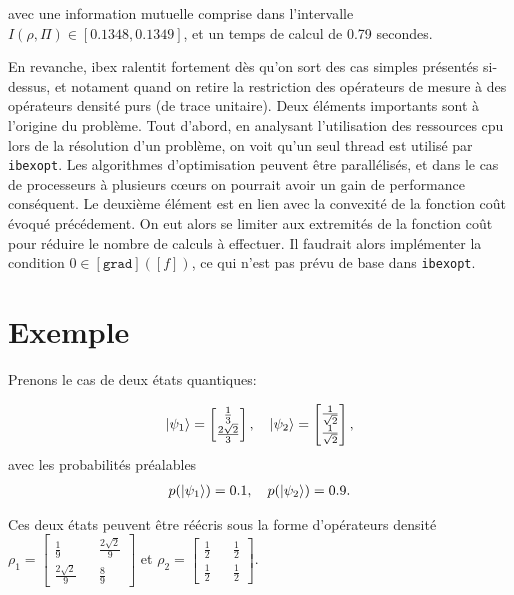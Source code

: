 avec une information mutuelle comprise dans l'intervalle $I(\rho, \Pi) \in [0.1348, 0.1349]$, et un temps de calcul de 0.79 secondes.


En revanche, ibex ralentit fortement dès qu'on sort des cas simples présentés si-dessus, et notament quand on retire la restriction des opérateurs de mesure à des opérateurs densité purs (de trace unitaire). Deux éléments importants sont à l'origine du problème. Tout d'abord, en analysant l'utilisation des ressources cpu lors de la résolution d'un problème, on voit qu'un seul thread est utilisé par \texttt{ibexopt}. Les algorithmes d'optimisation peuvent être parallélisés, et dans le cas de processeurs à plusieurs c\oe urs on pourrait avoir un gain de performance conséquent. Le deuxième élément est en lien avec la convexité de la fonction coût évoqué précédement. On eut alors se limiter aux extremités de la fonction coût pour réduire le nombre de calculs à effectuer. Il faudrait alors implémenter la condition $0 \in [\texttt{grad}]([f])$, ce qui n'est pas prévu de base dans \texttt{ibexopt}.


\section{Exemple}

Prenons le cas de deux états quantiques:

\begin{align}
    \ket{\psi_1} = \begin{bmatrix}\frac{1}{3} \\ \frac{2 \sqrt{2}}{3}\end{bmatrix} , \quad \ket{\psi_2} = \begin{bmatrix}\frac{1}{\sqrt{2}} \\ \frac{1}{\sqrt{2}}\end{bmatrix},
\end{align}
avec les probabilités préalables 
\begin{align}
    p(\ket{\psi_1}) = 0.1, \quad p(\ket{\psi_2}) = 0.9.
\end{align}

Ces deux états peuvent être réécris sous la forme d'opérateurs densité $\rho_1 = \begin{bmatrix}\frac{1}{9} && \frac{2 \sqrt{2}}{9} \\ \frac{2 \sqrt{2}}{9} && \frac{8}{9} \end{bmatrix}$ et $\rho_2 = \begin{bmatrix}\frac{1}{2} && \frac{1}{2} \\ \frac{1}{2} && \frac{1}{2} \end{bmatrix}$.

